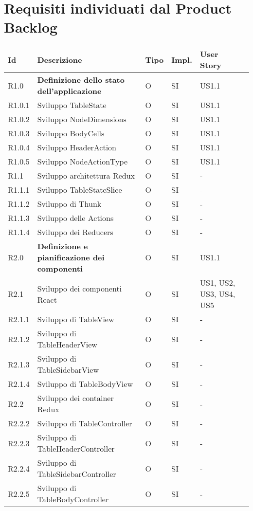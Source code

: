 \section{Requisiti individuati dal Product Backlog}
\begin{longtable} {
		|>{}p{10mm}| 
		|>{}p{60mm}|
		|>{}p{15mm}|
		|>{}p{15mm}|
		|>{}p{15mm}|
		>{}p{0mm}}
	\hline
	\textbf{Id} & \textbf{Descrizione} & \textbf{Tipo} & \textbf{Impl.} & \textbf{User Story} \\ \hline
	
	R1.0   & \textbf{Definizione dello stato dell'applicazione} & O & SI & US1.1\\ \hline
	R1.0.1 & Sviluppo TableState        & O & SI & US1.1\\ \hline
	R1.0.2 & Sviluppo NodeDimensions    & O & SI & US1.1\\ \hline
	R1.0.3 & Sviluppo BodyCells         & O & SI & US1.1\\ \hline
	R1.0.4 & Sviluppo HeaderAction      & O & SI & US1.1\\ \hline
	R1.0.5 & Sviluppo NodeActionType    & O & SI & US1.1\\ \hline
	R1.1   & Sviluppo architettura Redux & O & SI & - \\ \hline
	R1.1.1 & Sviluppo TableStateSlice    & O & SI & - \\ \hline
	R1.1.2 & Sviluppo di Thunk & O & SI & - \\ \hline
	R1.1.3 & Sviluppo delle Actions & O & SI & - \\ \hline
	R1.1.4 & Sviluppo dei Reducers & O & SI & - \\ \hline
	
	R2.0   & \textbf{Definizione e pianificazione dei componenti} & O & SI & US1.1\\ \hline
	R2.1   & Sviluppo dei componenti React 		  & O & SI & US1, US2, US3, US4, US5 \\ \hline
	R2.1.1 & Sviluppo di TableView                & O & SI & -     \\ \hline
	R2.1.2 & Sviluppo di TableHeaderView          & O & SI & -     \\ \hline
	R2.1.3 & Sviluppo di TableSidebarView         & O & SI & -     \\ \hline
	R2.1.4 & Sviluppo di TableBodyView            & O & SI & -     \\ \hline
	R2.2   & Sviluppo dei container Redux         & O & SI & -     \\ \hline
	R2.2.2 & Sviluppo di TableController          & O & SI & -     \\ \hline
	R2.2.3 & Sviluppo di TableHeaderController    & O & SI & -     \\ \hline
	R2.2.4 & Sviluppo di TableSidebarController   & O & SI & -     \\ \hline
	R2.2.5 & Sviluppo di TableBodyController      & O & SI & -     \\ \hline


\end{longtable}
